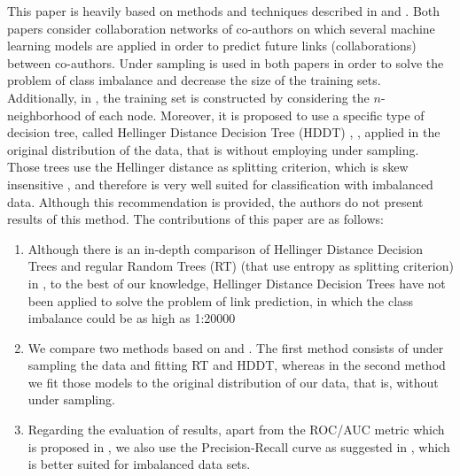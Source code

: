 \documentclass{acm_proc_article-sp}
\begin{document}



This paper is heavily based on methods and techniques described in \cite{Hasan06linkprediction} and \cite{Lichtenwalter:2010:NPM:1835804.1835837}. Both papers consider collaboration networks of co-authors on which several machine learning models are applied in order to predict future links (collaborations) between co-authors. Under sampling is used in both papers in order to solve the problem of class imbalance and decrease the size of the training sets. Additionally, in \cite{Lichtenwalter:2010:NPM:1835804.1835837}, the training set is constructed by considering the $n$-neighborhood of each node. Moreover, it is proposed to use a specific type of decision tree, called Hellinger Distance Decision Tree (HDDT) \cite{Cieslak2008}, \cite{Cieslak2012}, applied in the original distribution of the data, that is without employing under sampling. Those trees use the Hellinger distance as splitting criterion, which is skew insensitive \cite{Cieslak2012}, and therefore is very well suited for classification with imbalanced data. Although this recommendation is provided, the authors do not present results of this method. The contributions of this paper are as follows:

\begin{enumerate}
	\item Although there is an in-depth comparison of Hellinger Distance Decision Trees and regular Random Trees (RT) (that use entropy as splitting criterion) in \cite{Cieslak2012}, to the best of our knowledge, Hellinger Distance Decision Trees have not been applied to solve the problem of link prediction, in which the class imbalance could be as high as 1:20000
	\item We compare two methods based on \cite{Hasan06linkprediction} and \cite{Lichtenwalter:2010:NPM:1835804.1835837}. The first method consists of under sampling the data and fitting RT and HDDT, whereas in the second method we fit those models to the original distribution of our data, that is, without under sampling.
	\item Regarding the evaluation of results, apart from the ROC/AUC metric which is proposed in \cite{Lichtenwalter:2010:NPM:1835804.1835837}, we also use the Precision-Recall curve as suggested in \cite{saito2015precision}, which is better suited for imbalanced data sets. 
\end{enumerate}
 
\end{document}
